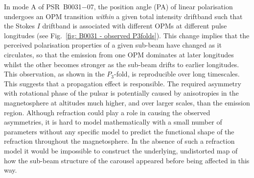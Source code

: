 In mode A of PSR~B0031$-$07, the position angle (PA) of linear polarisation undergoes an OPM transition \textit{within} a given total intensity driftband such that the Stokes $I$ driftband is associated with different OPMs at different pulse longitudes (see Fig.~\ref{fig: B0031 - observed P3folds}). This change implies that the perceived polarisation properties of a given sub-beam have changed as it circulates, so that the emission from one OPM dominates at later longitudes whilst the other becomes stronger as the sub-beam drifts to earlier longitudes. This observation, as shown in the $P_3$-fold, is reproducible over long timescales. This suggests that a propagation effect is responsible. The required asymmetry with rotational phase of the pulsar is potentially caused by anisotropies in the magnetosphere at altitudes much higher, and over larger scales, than the emission region. Although refraction could play a role in causing the observed asymmetries, it is hard to model mathematically with a small number of parameters without any specific model to predict the functional shape of the refraction throughout the magnetosphere. In the absence of such a refraction model it would be impossible to construct the underlying, undistorted map of how the sub-beam structure of the carousel appeared before being affected in this way.


